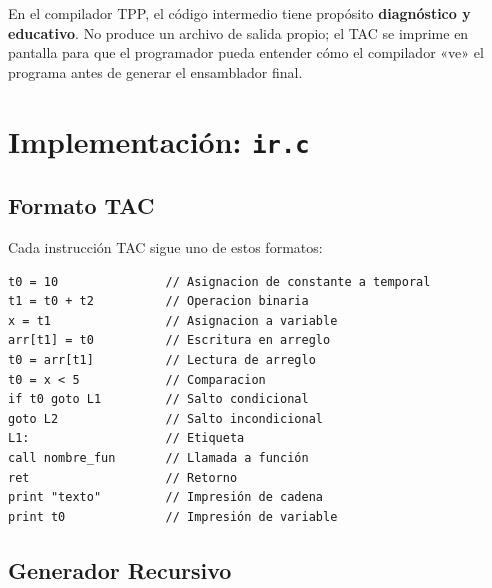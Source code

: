 \begin{notebox}
En el compilador TPP, el código intermedio tiene propósito \textbf{diagnóstico y educativo}. No produce un archivo de salida propio; el TAC se imprime en pantalla para que el programador pueda entender cómo el compilador «ve» el programa antes de generar el ensamblador final.
\end{notebox}

\section{Implementación: \texttt{ir.c}}

\subsection{Formato TAC}

Cada instrucción TAC sigue uno de estos formatos:

\begin{verbatim}
t0 = 10               // Asignacion de constante a temporal
t1 = t0 + t2          // Operacion binaria
x = t1                // Asignacion a variable
arr[t1] = t0          // Escritura en arreglo
t0 = arr[t1]          // Lectura de arreglo
t0 = x < 5            // Comparacion
if t0 goto L1         // Salto condicional
goto L2               // Salto incondicional
L1:                   // Etiqueta
call nombre_fun       // Llamada a función
ret                   // Retorno
print "texto"         // Impresión de cadena
print t0              // Impresión de variable
\end{verbatim}

\subsection{Generador Recursivo}

